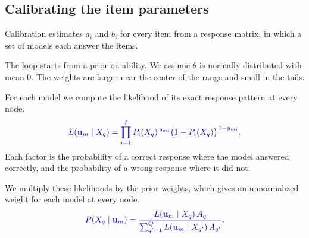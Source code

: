 \subsection{Calibrating the item parameters}

Calibration estimates $a_i$ and $b_i$ for every item from a response matrix, in
which a set of models each answer the items. 

The loop starts from a prior on ability. We assume $\theta$ is normally
distributed with mean $0$.  The weights are larger near the center of the
range and small in the tails. 

For each model we compute the likelihood of its exact response pattern at every
node. 
\begin{equation}
  \textcolor{blue}{L(\mathbf{u}_m \mid X_q)
  = \prod_{i=1}^{I} P_i(X_q)^{\,y_{mi}}
    \big(1 - P_i(X_q)\big)^{\,1 - y_{mi}} .}
  \label{eq:pattern-likelihood}
\end{equation}
Each factor is the probability of a correct response where the model answered
correctly, and the probability of a wrong response where it did not.

We multiply these likelihoods by the prior weights, which gives an unnormalized
weight for each model at every node. 
\begin{equation}
  \textcolor{blue}{P(X_q \mid \mathbf{u}_m)
  = \frac{L(\mathbf{u}_m \mid X_q)\, A_q}
         {\sum_{q'=1}^{Q} L(\mathbf{u}_m \mid X_{q'})\, A_{q'}} .}
  \label{eq:estep-posterior}
\end{equation}

